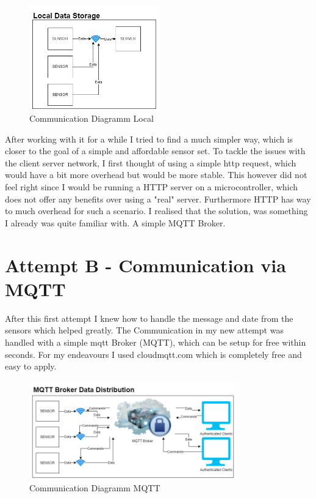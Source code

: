 \begin{figure}[ht]
  \begin{center}
\includegraphics[width=0.5\textwidth]{images/CommunicationDiagrammLocal.png}
  \end{center}
  \caption{Communication Diagramm Local}
  \label{fig:CommunicationDiagrammLocal}
\end{figure}
After working with it for a while I tried to find a much simpler way, which is closer to the goal of a simple and affordable sensor set. To tackle the issues with the client server network, I first thought of using a simple http request, which would have a bit more overhead but would be more stable. This however did not feel right since I would be running a HTTP server on a microcontroller, which does not offer any benefits over using a "real" server. Furthermore HTTP has way to much overhead for such a scenario. I realised that the solution, was something I already was quite familiar with. A simple MQTT Broker. 



\section{Attempt B - Communication via MQTT}

After this first attempt I knew how to handle the message and date from the sensors which helped greatly. 
The Communication in my new attempt was handled with a simple \acrshort{mqtt} Broker (\gls{MQTT}), which can be setup for free within seconds. For my endeavours I used cloudmqtt.com which is completely free and easy to apply. 


\begin{figure}[ht]
  \begin{center}
\includegraphics[width=0.8\textwidth]{images/CommunicationDiagrammMQTT.png}
  \end{center}
  \caption{Communication Diagramm MQTT}
  \label{fig:CommunicationDiagrammMQTT}
\end{figure}

